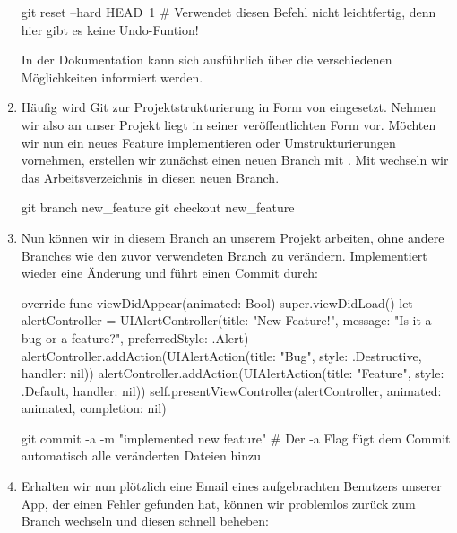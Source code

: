 \documentclass[parskip=half, final]{scrreprt}
\begin{document}
\begin{lecture}
\begin{enumerate}
\begin{shcode}
git reset --hard HEAD~1 # Verwendet diesen Befehl nicht leichtfertig, denn hier gibt es keine Undo-Funtion!
\end{shcode}

In der Dokumentation  kann sich ausführlich über die verschiedenen Möglichkeiten informiert werden.

\item Häufig wird Git zur Projektstrukturierung in Form von  eingesetzt. Nehmen wir also an unser Projekt liegt in seiner veröffentlichten Form vor. Möchten wir nun ein neues Feature implementieren oder Umstrukturierungen vornehmen, erstellen wir zunächst einen neuen Branch mit . Mit  wechseln wir das Arbeitsverzeichnis in diesen neuen Branch.

\begin{shcode}
git branch new_feature
git checkout new_feature
\end{shcode}

\item Nun können wir in diesem Branch an unserem Projekt arbeiten, ohne andere Branches wie den zuvor verwendeten  Branch zu verändern. Implementiert  wieder eine Änderung und führt einen Commit durch:

\begin{swiftcode}
override func viewDidAppear(animated: Bool) {
    super.viewDidLoad()
    let alertController = UIAlertController(title: "New Feature!", message: "Is it a bug or a feature?", preferredStyle: .Alert)
    alertController.addAction(UIAlertAction(title: "Bug", style: .Destructive, handler: nil))
    alertController.addAction(UIAlertAction(title: "Feature", style: .Default, handler: nil))
    self.presentViewController(alertController, animated: animated, completion: nil)
}
\end{swiftcode}

\begin{shcode}
git commit -a -m "implemented new feature" # Der -a Flag fügt dem Commit automatisch alle veränderten Dateien hinzu
\end{shcode}

\item Erhalten wir nun plötzlich eine Email eines aufgebrachten Benutzers unserer App, der einen Fehler gefunden hat, können wir problemlos zurück zum  Branch wechseln und diesen schnell beheben:


\end{enumerate}
\end{lecture}
\end{document}
